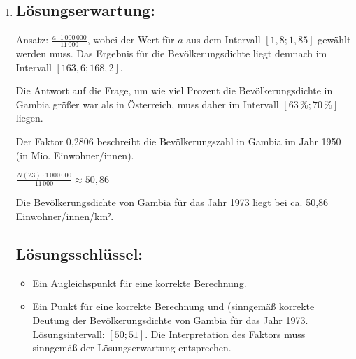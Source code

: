 \begin{langesbeispiel}
{\begin{enumerate}
	\item \subsection{Lösungserwartung:}
		Ansatz: $\frac{a\cdot 1\,000\,000}{11\,000}$, wobei der Wert für $a$ aus dem Intervall $[1,8;1,85]$ gewählt werden muss. Das Ergebnis für die Bevölkerungsdichte liegt demnach im Intervall $[163,6; 168,2]$.
		
		Die Antwort auf die Frage, um wie viel Prozent die Bevölkerungsdichte in Gambia größer war als in Österreich, muss daher im Intervall $[63\,\%; 70\,\%]$ liegen.
		
		Der Faktor 0,2806 beschreibt die Bevölkerungszahl in Gambia im Jahr 1950 (in Mio. Einwohner/innen).
		
		$\frac{N(23)\cdot 1\,000\,000}{11\,000}\approx 50,86$
		
		Die Bevölkerungsdichte von Gambia für das Jahr 1973 liegt bei ca. 50,86 Einwohner/innen/km$²$.
		
		
	\subsection{Lösungsschlüssel:}
	
\begin{itemize}
	\item Ein Augleichspunkt für eine korrekte Berechnung.
	\item  Ein Punkt für eine korrekte Berechnung und (sinngemäß korrekte Deutung der Bevölkerungsdichte von Gambia für das Jahr 1973. Lösungsintervall: $[50;51]$. Die Interpretation des Faktors muss sinngemäß der Lösungserwartung entsprechen.
\end{itemize}
\end{enumerate}}
		\end{langesbeispiel}